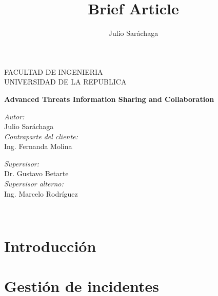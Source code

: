 \documentclass[11pt]{article}
\title{Brief Article}
\author{Julio Saráchaga}
\date{}
\begin{document}
  
  \begin{titlepage}

\begin{center}
\vspace*{-1in}

FACULTAD DE INGENIERIA\\
\vspace*{0.15in}
UNIVERSIDAD DE LA REPUBLICA \\
\vspace*{0.6in}
\vspace*{0.2in}
\begin{Large}
\textbf{Advanced Threats Information Sharing and Collaboration} \\
\end{Large}
\vspace*{0.3in}
\end{center}

\begin{minipage}{0.4\textwidth}
\begin{flushleft} \large
\emph{Autor:}\\
Julio Saráchaga\\
\bigskip
\emph{Contraparte del cliente:}\\
Ing. Fernanda Molina
\end{flushleft}
\end{minipage}
\begin{minipage}{0.4\textwidth}
\begin{flushright} \large
\emph{Supervisor:} \\
Dr. Gustavo Betarte\\
\bigskip
\emph{Supervisor alterno:} \\
Ing. Marcelo Rodríguez
\end{flushright}
\end{minipage}\\[3cm]

\end{titlepage}
  

\section{Introducción}



\section{Gestión de incidentes}
\end{document}

